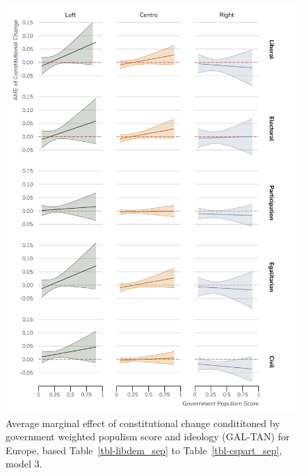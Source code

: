 \documentclass[
  abstract]{article}
\begin{document}
\begin{figure}[H]

{\centering \includegraphics{results/graphs/constchange_eu.pdf}

}

\caption{\label{fig-eu}Average marginal effect of constitutional change
condititoned by government weighted populism score and ideology
(GAL-TAN) for Europe, based Table~\ref{tbl-libdem_sep} to
Table~\ref{tbl-cspart_sep}, model 3.}

\end{figure}
\end{document}
